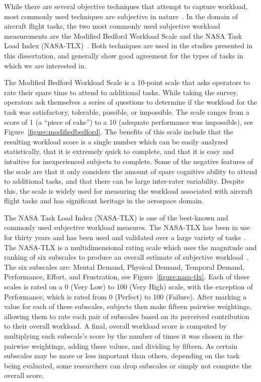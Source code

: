 While there are several objective techniques that attempt to capture workload, most commonly used techniques are subjective in nature~\citep{hart_development_1988}.
In the domain of aircraft flight tasks, the two most commonly used subjective workload measurements are the Modified Bedford Workload Scale and the NASA Task Load Index (NASA-TLX)~\citep{roscoe_subjective_1990, hart_development_1988, hart_nasa-task_2006}.
Both techniques are used in the studies presented in this dissertation, and generally show good agreement for the types of tasks in which we are interested in.

The Modified Bedford Workload Scale is a 10-point scale that asks operators to rate their spare time to attend to additional tasks.
While taking the survey, operators ask themselves a series of questions to determine if the workload for the task was satisfactory, tolerable, possible, or impossible.
The scale ranges from a score of 1 (a ``piece of cake'') to a 10 (adequate performance was impossible), see Figure~\ref{figure:modifiedbedford}.
The benefits of this scale include that the resulting workload score is a single number which can be easily analyzed statistically, that it is extremely quick to complete, and that it is easy and intuitive for inexperienced subjects to complete.
Some of the negative features of the scale are that it only considers the amount of spare cognitive ability to attend to additional tasks, and that there can be large inter-rater variability.
Despite this, the scale is widely used for measuring the workload associated with aircraft flight tasks and has significant heritage in the aerospace domain.

The NASA Task Load Index (NASA-TLX) is one of the best-known and commonly used subjective workload measures.
The NASA-TLX has been in use for thirty years and has been used and validated over a large variety of tasks~\citep{hart_nasa-task_2006}.
The NASA-TLX is a multidimensional rating scale which uses the magnitude and ranking of six subscales to produce an overall estimate of subjective workload~\citep{hart_development_1988}.
The six subscales are: Mental Demand, Physical Demand, Temporal Demand, Performance, Effort, and Frustration, see Figure~\ref{figure:nasa-tlx}.
Each of these scales is rated on a 0 (Very Low) to 100 (Very High) scale, with the exception of Performance, which is rated from 0 (Perfect) to 100 (Failure).
After marking a value for each of these subscales, subjects then make fifteen pairwise weightings, allowing them to rate each pair of subscales based on its perceived contribution to their overall workload.
A final, overall workload score is computed by multiplying each subscale's score by the number of times it was chosen in the pairwise weightings, adding these values, and dividing by fifteen.
As certain subscales may be more or less important than others, depending on the task being evaluated, some researchers can drop subscales or simply not compute the overall score.

